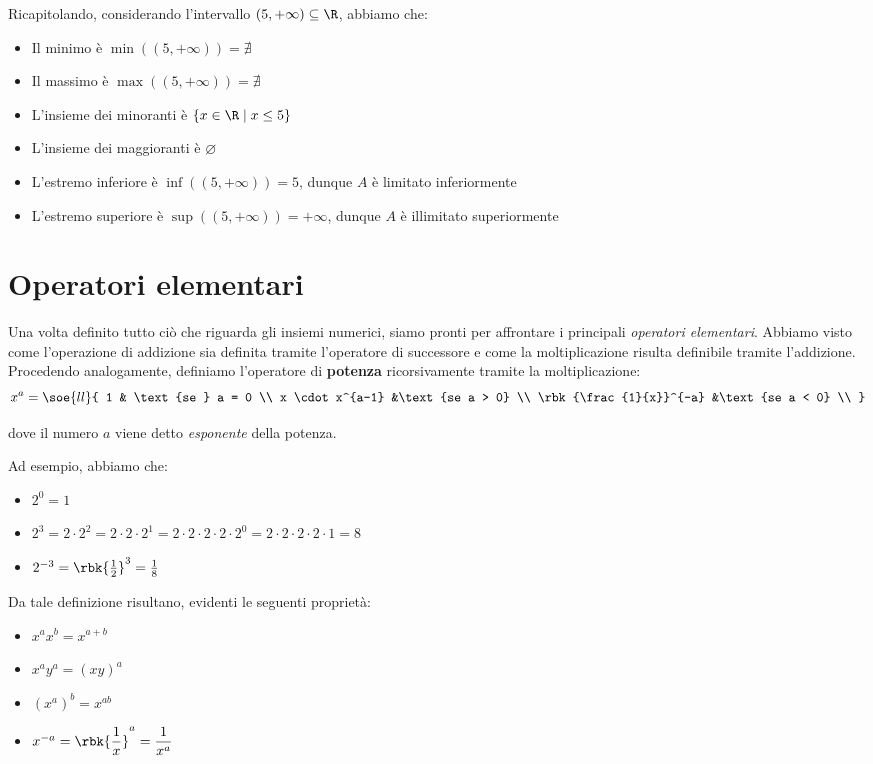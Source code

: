 \documentclass[a4paper, 12pt]{report}
\begin{document}
    Ricapitolando, considerando l'intervallo $(5,+\infty) \subseteq \R$, abbiamo che:
    \begin{itemize}
        \item Il minimo è $\min((5,+\infty)) = \nexists$
        \item Il massimo è $\max((5,+\infty)) = \nexists$
        \item L'insieme dei minoranti è $\{x \in \R \mid x \leq 5\}$
        \item L'insieme dei maggioranti è $\varnothing$
        \item L'estremo inferiore è $\inf((5,+\infty)) = 5$, dunque $A$ è limitato inferiormente
        \item L'estremo superiore è $\sup((5,+\infty)) = +\infty$, dunque $A$ è illimitato superiormente
    \end{itemize}

    \newpage

    \section{Operatori elementari}

    Una volta definito tutto ciò che riguarda gli insiemi numerici, siamo pronti per affrontare i principali \textit{operatori elementari}. Abbiamo visto come l'operazione di addizione sia definita tramite l'operatore di successore e come la moltiplicazione risulta definibile  tramite l'addizione. Procedendo analogamente, definiamo l'operatore di \textbf{potenza} ricorsivamente tramite la moltiplicazione:
    \[x^a = \soe{ll}{
        1 & \text{se } a = 0 \\
        x \cdot x^{a-1} &\text{se a > 0} \\
        \rbk{\frac{1}{x}}^{-a} &\text{se a < 0} \\
    }\]

    dove il numero $a$ viene detto \textit{esponente} della potenza.

    Ad esempio, abbiamo che:
    \begin{itemize}
        \item $2^0 = 1$
        \item $2^3 = 2 \cdot 2^2 = 2 \cdot 2 \cdot 2^1 = 2 \cdot 2 \cdot 2 \cdot 2 \cdot 2^0 = 2 \cdot 2 \cdot 2 \cdot 2 \cdot 1 = 8$
        \item $2^{-3} = \rbk{\frac{1}{2}}^{3} = \frac{1}{8}$
    \end{itemize} 

    Da tale definizione risultano, evidenti le seguenti proprietà:
    \begin{itemize}
        \item $x^ax^b = x^{a+b}$
        \item $x^ay^a = (xy)^a$
        \item $(x^a)^b = x^{ab}$
        \item $x^{-a} = \rbk{\dfrac{1}{x}}^a = \dfrac{1}{x^a}$
    \end{itemize}
\end{document}
